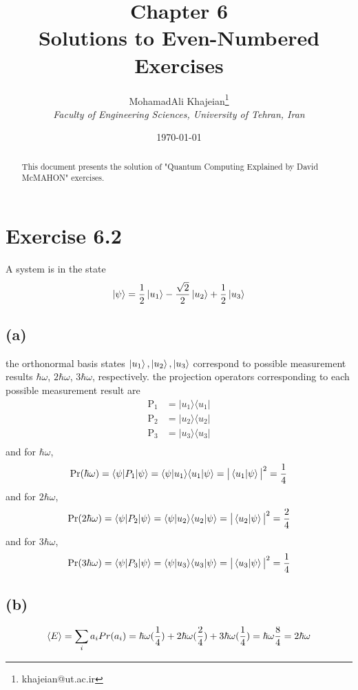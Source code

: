 \documentclass{article}
\title{\textbf{Chapter 6} \\ \small Solutions to Even-Numbered Exercises}
\author{
    MohamadAli Khajeian\footnote{khajeian@ut.ac.ir} \\ 
    \small \textit{Faculty of Engineering Sciences, University of Tehran, Iran} \\ 
}
\date{\today}
\newcommand{\op}[2]{|#1\rangle \langle#2|}
\newcommand{\sand}[3]{\braket{#1 | #2 | #3}}
\newcommand{\sandop}[3]{\braket{#1 #2 #3}}
\begin{document}
\maketitle

\begin{abstract}
    This document presents the solution of "Quantum Computing Explained by David McMAHON" exercises.
\end{abstract}

\section*{Exercise 6.2}
A system is in the state
\begin{align*}
    \ket{\psi} = \frac{1}{2}\ket{u_1} - \frac{\sqrt{2}}{2}\ket{u_2} + \frac{1}{2}\ket{u_3}
\end{align*}
\subsection*{(a)}
the orthonormal basis states $\ket{u_1},\ket{u_2},\ket{u_3}$ correspond to possible measurement results $\hbar\omega$, $2\hbar\omega$, $3\hbar\omega$, respectively. the projection operators
corresponding to each possible measurement result are
\begin{align*}
    \text{P}_1 &= \op{u_1}{u_1}\\
    \text{P}_2 &= \op{u_2}{u_2}\\
    \text{P}_3 &= \op{u_3}{u_3}\\
\end{align*}
and for $\hbar\omega$,
\begin{align*}
    \text{Pr}(\hbar\omega) = \sand{\psi}{P_1}{\psi} = \sandop{\psi}{\op{u_1}{u_1}}{\psi} = \big|\braket{u_1|\psi}\big|^2 = \frac{1}{4}
\end{align*}
and for $2\hbar\omega$,
\begin{align*}
    \text{Pr}(2\hbar\omega) = \sand{\psi}{P_2}{\psi} = \sandop{\psi}{\op{u_2}{u_2}}{\psi} = \big|\braket{u_2|\psi}\big|^2 = \frac{2}{4}
\end{align*}
and for $3\hbar\omega$,
\begin{align*}
    \text{Pr}(3\hbar\omega) = \sand{\psi}{P_3}{\psi} = \sandop{\psi}{\op{u_3}{u_3}}{\psi} = \big|\braket{u_3|\psi}\big|^2 = \frac{1}{4}
\end{align*}
\subsection*{(b)}
\begin{align*}
    \braket{E} = \sum_i a_i Pr(a_i) = \hbar\omega(\frac{1}{4}) + 2\hbar\omega(\frac{2}{4}) + 3\hbar\omega(\frac{1}{4}) = \hbar\omega\frac{8}{4} = 2\hbar\omega
\end{align*}
\end{document}
